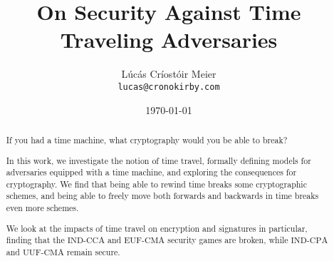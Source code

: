 

\date{\today}
\title{On Security Against Time Traveling Adversaries}
\author{Lúcás Críostóir Meier\\\texttt{lucas@cronokirby.com}}



\maketitle

\begin{abstract}
    If you had a time machine, what cryptography would you be able to break?

    In this work, we investigate the notion of time travel, formally defining models for adversaries
    equipped with a time machine, and exploring the consequences
    for cryptography.
    We find that being able to rewind time breaks some
    cryptographic schemes, and being able to freely move both
    forwards and backwards in time breaks even more schemes.

    We look at the impacts of time travel on encryption and signatures in particular,
    finding that the $\text{IND-CCA}$ and $\text{EUF-CMA}$ security
    games are broken, while $\text{IND-CPA}$ and $\text{UUF-CMA}$
    remain secure.
\end{abstract}




{\small }
\clearpage
\appendix

